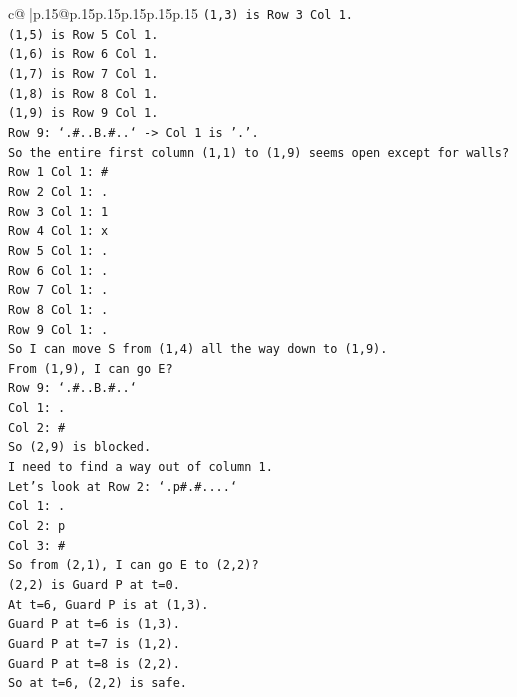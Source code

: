 \documentclass{article}
\begin{document}
{\begin{supertabular}{c@{$\;$}|p{.15\linewidth}@{}p{.15\linewidth}p{.15\linewidth}p{.15\linewidth}p{.15\linewidth}p{.15\linewidth}}
{{{\texttt{(1,3) is Row 3 Col 1.} \\
\texttt{(1,5) is Row 5 Col 1.} \\
\texttt{(1,6) is Row 6 Col 1.} \\
\texttt{(1,7) is Row 7 Col 1.} \\
\texttt{(1,8) is Row 8 Col 1.} \\
\texttt{(1,9) is Row 9 Col 1.} \\
\texttt{Row 9: `.\#..B.\#..` {-}> Col 1 is '.'.} \\
\texttt{So the entire first column (1,1) to (1,9) seems open except for walls?} \\
\texttt{Row 1 Col 1: \#} \\
\texttt{Row 2 Col 1: .} \\
\texttt{Row 3 Col 1: 1} \\
\texttt{Row 4 Col 1: x} \\
\texttt{Row 5 Col 1: .} \\
\texttt{Row 6 Col 1: .} \\
\texttt{Row 7 Col 1: .} \\
\texttt{Row 8 Col 1: .} \\
\texttt{Row 9 Col 1: .} \\
\texttt{So I can move S from (1,4) all the way down to (1,9).} \\
\texttt{From (1,9), I can go E?} \\
\texttt{Row 9: `.\#..B.\#..`} \\
\texttt{Col 1: .} \\
\texttt{Col 2: \#} \\
\texttt{So (2,9) is blocked.} \\
\texttt{I need to find a way out of column 1.} \\
\texttt{Let's look at Row 2: `.p\#.\#....`} \\
\texttt{Col 1: .} \\
\texttt{Col 2: p} \\
\texttt{Col 3: \#} \\
\texttt{So from (2,1), I can go E to (2,2)?} \\
\texttt{(2,2) is Guard P at t=0.} \\
\texttt{At t=6, Guard P is at (1,3).} \\
\texttt{Guard P at t=6 is (1,3).} \\
\texttt{Guard P at t=7 is (1,2).} \\
\texttt{Guard P at t=8 is (2,2).} \\
\texttt{So at t=6, (2,2) is safe.} \\
}}}
\end{supertabular}}
\end{document}

